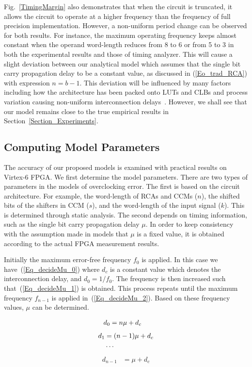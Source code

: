 \documentclass[prodmode,acmtrets]{acmsmall} %
\begin{document}
Fig.~\ref{TimingMargin} also demonstrates that when the circuit is truncated, it allows the circuit to operate at a higher frequency than the frequency of full precision implementation. However, a non-uniform period change can be observed for both results. For instance, the maximum operating frequency keeps almost constant when the operand word-length reduces from 8 to 6 or from 5 to 3 in both the experimental results and those of timing analyzer. This will cause a slight deviation between our analytical model which assumes that the single bit carry propagation delay to be a constant value, as discussed in (\ref{Eo_trad_RCA}) with expression $n=b-1$. This deviation will be influenced by many factors including how the architecture has been packed onto LUTs and CLBs and process variation causing non-uniform interconnection delays~\cite{FPGAPV}. However, we shall see that our model remains close to the true empirical results in Section~\ref{Section_Experiments}.

\subsection{Computing Model Parameters}
The accuracy of our proposed models is examined with practical results on Virtex-6 FPGA. We first determine the model parameters. There are two types of parameters in the models of overclocking error. The first is based on the circuit architecture. For example, the word-length of RCAs and CCMs ($n$), the shifted bits of the shifters in CCM ($s$), and the word-length of the input signal ($k$). This is determined through static analysis. The second depends on timing information, such as the single bit carry propagation delay $\mu$. In order to keep consistency with the assumption made in models that $\mu$ is a fixed value, it is obtained according to the actual FPGA measurement results.

Initially the maximum error-free frequency $f_0$ is applied. In this case we have~(\ref{Eq_decideMu_0}) where $d_c$ is a constant value which denotes the interconnection delay, and $d_0=1/f_0$. The frequency is then increased such that~(\ref{Eq_decideMu_1}) is obtained. This process repeats until the maximum frequency $f_{n-1}$ is applied in~(\ref{Eq_decideMu_2}). Based on these frequency values, $\mu$ can be determined.

\begin{eqnarray}\label{Eq_decideMu_0}
  d_0 &= n\mu+d_c
  \vspace{-13ex}
\end{eqnarray}
\vspace{-4ex}
\begin{align}\label{Eq_decideMu_1}
  d_1 &= (n-1)\mu+d_c    \\
  &\cdots               \notag
  \vspace{-3ex}
\end{align}
\vspace{-4ex}
\begin{eqnarray}\label{Eq_decideMu_2}
  {d_{n-1}} &= \mu+d_c
\end{eqnarray}
\end{document}
